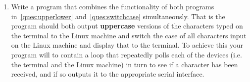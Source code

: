 \documentclass[a4paper,10pt]{article}
\begin{document}
\begin{enumerate}
\item 
\label{ques:final}
Write a program that combines the functionality of both programs
in~\ref{ques:upperlower} and~\ref{ques:switchcase}
simultaneously. That is the program should both output
\textbf{uppercase} versions of the characters typed on the terminal to
the Linux machine and switch the case of all characters input on the
Linux machine and display that to the terminal. To achieve this your
program will to contain a loop that repeatedly polls each of the
devices (i.e. the terminal and the Linux machine) in turn to see if a
character has been received, and if so outputs it to the appropriate
serial interface.

\end{enumerate}

\thispagestyle{rcsfooters}
\pagestyle{rcsfooters}
\end{document}
